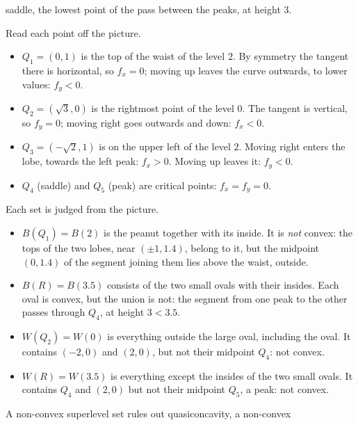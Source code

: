 \begin{solutions}
        saddle, the lowest point of the pass between the peaks, at height
        $3$.
  \item Read each point off the picture.
        \begin{itemize}[leftmargin=1.2em,itemsep=0.2ex]
          \item $Q_{1}=(0,1)$ is the top of the waist of the level $2$. By
                symmetry the tangent there is horizontal, so $f_{x}=0$;
                moving up leaves the curve outwards, to lower values:
                $f_{y}<0$.
          \item $Q_{2}=(\sqrt3,0)$ is the rightmost point of the level $0$.
                The tangent is vertical, so $f_{y}=0$; moving right goes
                outwards and down: $f_{x}<0$.
          \item $Q_{3}=(-\sqrt2,1)$ is on the upper left of the level $2$.
                Moving right enters the lobe, towards the left peak:
                $f_{x}>0$. Moving up leaves it: $f_{y}<0$.
          \item $Q_{4}$ (saddle) and $Q_{5}$ (peak) are critical points:
                $f_{x}=f_{y}=0$.
        \end{itemize}
  \item Each set is judged from the picture.
        \begin{itemize}[leftmargin=1.2em,itemsep=0.2ex]
          \item $B(Q_{1})=B(2)$ is the peanut together with its inside.
                It is \emph{not} convex: the tops of the two lobes, near
                $(\pm1,1.4)$, belong to it, but the midpoint $(0,1.4)$ of
                the segment joining them lies above the waist, outside.
          \item $B(R)=B(3.5)$ consists of the two small ovals with their
                insides. Each oval is convex, but the union is not: the
                segment from one peak to the other passes through $Q_{4}$,
                at height $3<3.5$.
          \item $W(Q_{2})=W(0)$ is everything outside the large oval,
                including the oval. It contains $(-2,0)$ and $(2,0)$, but
                not their midpoint $Q_{4}$: not convex.
          \item $W(R)=W(3.5)$ is everything except the insides of the two
                small ovals. It contains $Q_{4}$ and $(2,0)$ but not their
                midpoint $Q_{5}$, a peak: not convex.
        \end{itemize}
        A non-convex superlevel set rules out quasiconcavity, a non-convex

\end{solutions}

